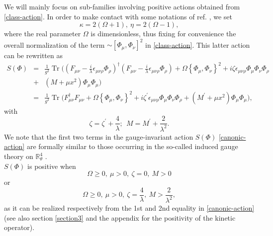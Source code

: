 \documentclass[a4paper,11pt,twoside]{article}
\numberwithin{equation}{section}
\DeclareMathOperator{\tr}{Tr}
\theoremstyle{nonumberplain}
\newcounter{and}
\begin{document}
%
We will mainly focus on sub-families involving positive actions obtained from \eqref{class-action}. In order to make contact with some notations of ref. \cite{Wallet:2007c}, we set%
%
\begin{equation}
\kappa= 2(\Omega+1),\ \eta= 2(\Omega-1), \label{redef-param}
\end{equation}
%
where the real parameter $\Omega$ is dimensionless, thus fixing for convenience the overall normalization of the term $\sim[\Phi_\mu,\Phi_\nu]^2$ in \eqref{class-action}. This latter action can be rewritten as
\begin{eqnarray}
S(\Phi)&=&\frac{1}{g^2} \tr\big((F_{\mu\nu} - \frac{i}{\lambda} \epsilon_{\mu\nu\rho} \Phi_\rho)^\dag (F_{\mu\nu} - \frac{i}{\lambda} \epsilon_{\mu\nu\rho} \Phi_\rho) + \Omega\left\{\Phi_\mu,\Phi_\nu\right\}^2
+i \zeta \epsilon_{\mu\nu\rho} \Phi_\mu \Phi_\nu \Phi_\rho\nonumber\\
&+& (M+\mu x^2) \Phi_\mu \Phi_\mu \big)\nonumber\\
&=&\frac{1}{g^2} \tr\big(F^\dag_{\mu\nu}F_{\mu\nu} + \Omega\left\{\Phi_\mu,\Phi_\nu\right\}^2 + i \zeta^\prime\epsilon_{\mu\nu\rho} \Phi_\mu \Phi_\nu \Phi_\rho + \left(M^\prime+\mu x^2\right) \Phi_\mu \Phi_\mu \big)\label{canonic-action},
\end{eqnarray}
with
\begin{equation}
\zeta = \zeta^\prime+\frac{4}{\lambda};\ \ M=M^\prime+\frac{2}{\lambda^2}. \label{new-param}
\end{equation}
We note that the first two terms in the gauge-invariant action $S(\Phi)$ \eqref{canonic-action} are formally similar to those occurring in the so-called induced gauge theory on $\mathbb{R}^4_\theta$ \cite{Wallet:2007c}.\\
$S(\Phi)$ is positive when 
\begin{equation}
\Omega\ge0,\ \mu>0,\ \zeta=0,\ M>0\label{thecondition-positivity}
\end{equation}
or
\begin{equation}
\Omega\ge0,\ \mu>0,\ \zeta=\frac{4}{\lambda},\ M>\frac{2}{\lambda^2}, 
\end{equation}
as it can be realized respectively from the 1st and 2nd equality in \eqref{canonic-action} (see also section \ref{section3} and the appendix for the positivity of the kinetic operator).\par
\end{document}
